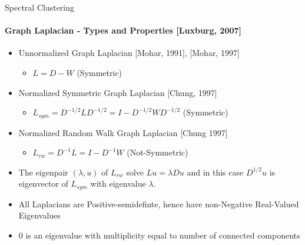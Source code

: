 \documentclass[10pt,a4paper, nocenter]{beamer}
\begin{document}
	\begin{frame}{Spectral Clustering}
		\framesubtitle{Graph Laplacian - Types and Properties [Luxburg, 2007]}
		
		\begin{itemize}
			\item<1-> Unnormalized Graph Laplacian [Mohar, 1991], [Mohar, 1997]
				\begin{itemize}
					\item $L = D-W$ (Symmetric)
				\end{itemize}
			\item<2-> Normalized Symmetric Graph Laplacian [Chung, 1997]
				\begin{itemize}
					\item $L_{sym} = D^{-1/2}LD^{-1/2} = I - D^{-1/2}WD^{-1/2}$ (Symmetric)
				\end{itemize}
			\item<3-> Normalized Random Walk Graph Laplacian [Chung 1997]
				\begin{itemize}
					\item $L_{rw} = D^{-1}L = I - D^{-1}W$ (Not-Symmetric)
				\end{itemize}
			\item<4-> The eigenpair $(\lambda, u)$ of $L_{rw}$ solve $Lu=\lambda Du$ and in this case $D^{1/2}u$ is eigenvector of $L_{sym}$ with eigenvalue $\lambda$. 
			\item<5-> All Laplacians are Positive-semidefinte, hence have non-Negative Real-Valued Eigenvalues
			\item<6-> 0 is an eigenvalue with multiplicity equal to number of connected components
		\end{itemize}
	\end{frame}
\end{document}
